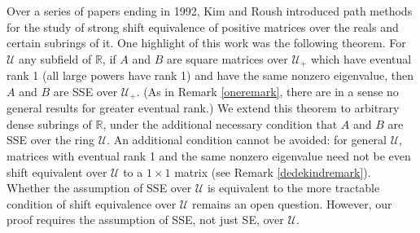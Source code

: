 \documentclass{amsart}
\theoremstyle{definition}
\theoremstyle{remark}
\numberwithin{equation}{section}
\begin{document}
Over a series of papers \cite{KR2,KR3,KR4,KR5} ending in 1992, 
Kim and Roush introduced  path methods for 
the study of strong shift equivalence of positive matrices over 
the reals and certain subrings of it.
One highlight of this work 
was the following theorem. For $\mathcal U $ 
any subfield of $\mathbb R$,  if $A$ and $B$ are 
square matrices over $\mathcal U_+$ which have  
eventual rank 1 (all large powers have rank 1) 
and have  the same 
nonzero eigenvalue, then $A$ and 
$B$ are SSE over $\mathcal U_+$. 
(As in Remark \ref{oneremark},  
there are in a sense no general results 
for greater eventual rank.) 
%
We extend this  
theorem to arbitrary dense subrings of $\mathbb R$, 
under the additional necessary condition that $A$ and $B$ 
are SSE over the ring $\mathcal U$. 
An additional  condition cannot be avoided: 
for general $\mathcal U$, matrices  with eventual rank 1
and the same nonzero eigenvalue 
need not be even shift equivalent over $\mathcal U$ to a 
$1\times 1$ matrix (see  Remark 
\ref{dedekindremark}). 
Whether the assumption of SSE over $\mathcal U$ 
is equivalent to the more tractable 
condition of shift equivalence over 
$\mathcal U$ remains an open question. 
%
However, our proof requires the assumption of SSE, not just 
SE, over $\mathcal U$. 
\end{document}
